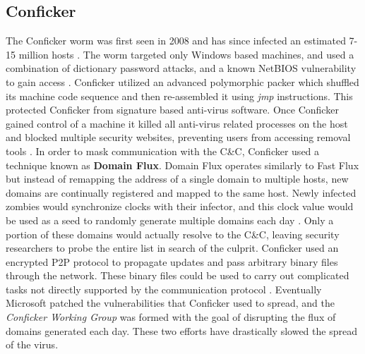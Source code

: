 \subsection{Conficker}
The Conficker worm was first seen in 2008 and has since infected an estimated
7-15 million hosts \cite{conficker}.  The worm targeted only Windows based machines,
and used a combination of dictionary password attacks, and a known NetBIOS
vulnerability to gain access \cite{conficker}.
Conficker utilized an advanced
polymorphic packer which shuffled its machine code sequence and then re-assembled
it using \textit{jmp} instructions.  This protected Conficker from signature
based anti-virus software.  Once Conficker gained control of a machine it killed
all anti-virus related
processes on the host and blocked multiple security websites, preventing users
from accessing removal tools \cite{conficker}.  In order to mask communication
with the C\&C, Conficker used a technique known as \textbf{Domain Flux}. Domain
Flux operates similarly to Fast Flux but instead of remapping the address of a
single domain to multiple hosts,
new domains are continually registered and mapped to the same host.
Newly infected zombies would
synchronize clocks with their infector, and this clock value would be used as a
seed to randomly generate multiple  domains each day \cite{conficker}.
Only a portion of these domains would actually resolve to the C\&C, leaving security
researchers to probe the entire list in search of the culprit.  Conficker used an
encrypted P2P protocol to propagate updates and pass arbitrary binary files
through the network. These binary files could be used to carry out complicated
tasks not directly supported by the communication protocol \cite{conficker}.
Eventually Microsoft patched the vulnerabilities that Conficker used to spread,
and the \textit{Conficker Working Group} was formed with the goal of disrupting
the flux of  domains generated each day.  These two efforts have
drastically slowed the spread of the virus.

